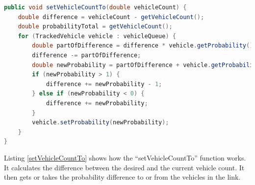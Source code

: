 \vspace{0.5em}

\begin{lstlisting}[caption={Set Vehicle Count Function of TrackedLink}, label=setVehicleCountTo, language=Java]
public void setVehicleCountTo(double vehicleCount) {
	double difference = vehicleCount - getVehicleCount();
	double probabilityTotal = getVehicleCount();
	for (TrackedVehicle vehicle : vehicleQueue) {
		double partOfDifference = difference * vehicle.getProbability() / probabilityTotal;
		difference -= partOfDifference;
		double newProbability = partOfDifference + vehicle.getProbability();
		if (newProbability > 1) {
			difference += newProbability - 1;
		} else if (newProbability < 0) {
			difference += newProbability;
		}
		vehicle.setProbability(newProbability);
	}
}
\end{lstlisting}

Listing \ref{setVehicleCountTo} shows how the ``setVehicleCountTo'' function works. It calculates the difference between the desired and the current vehicle count. It then gets or takes the probability difference to or from the vehicles in the link.